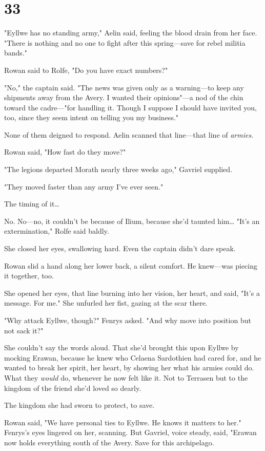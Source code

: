 
\chapter{33}

"Eyllwe has no standing army," Aelin said, feeling the blood drain from her face. "There is nothing and no one to fight after this spring---save for rebel militia bands."

Rowan said to Rolfe, "Do you have exact numbers?"

"No," the captain said. "The news was given only as a warning---to keep any shipments away from the Avery. I wanted their opinions"---a nod of the chin toward the cadre---"for handling it. Though I suppose I should have invited you, too, since they seem intent on telling you my business."

None of them deigned to respond. Aelin scanned that line---that line of
\emph{armies}.

Rowan said, "How fast do they move?"

"The legions departed Morath nearly three weeks ago," Gavriel supplied.

"They moved faster than any army I've ever seen."

The timing of it\ldots{}

No. No---no, it couldn't be because of Ilium, because she'd taunted him\ldots{} "It's an extermination," Rolfe said baldly.

She closed her eyes, swallowing hard. Even the captain didn't dare speak.

Rowan slid a hand along her lower back, a silent comfort. He knew---was piecing it together, too.

She opened her eyes, that line burning into her vision, her heart, and said, "It's a message. For me." She unfurled her fist, gazing at the scar there.

"Why attack Eyllwe, though?" Fenrys asked. "And why move into position but not sack it?"

She couldn't say the words aloud. That she'd brought this upon Eyllwe by mocking Erawan, because he knew who Celaena Sardothien had cared for, and he wanted to break her spirit, her heart, by showing her what his armies could do. What they \emph{would} do, whenever he now felt like it. Not to Terrasen  but to the kingdom of the friend she'd loved so dearly.

The kingdom she had sworn to protect, to save.

Rowan said, "We have personal ties to Eyllwe. He knows it matters to her." Fenrys's eyes lingered on her, scanning. But Gavriel, voice steady, said, "Erawan now holds everything south of the Avery. Save for this archipelago.


